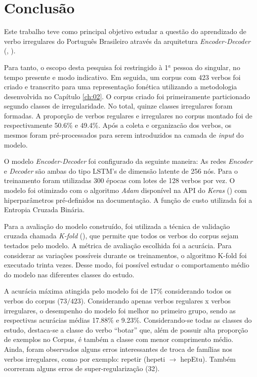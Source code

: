 \chapter{Conclusão}
\label{ch:08}

Este trabalho teve como principal objetivo estudar a questão do aprendizado de verbo irregulares do Português Brasileiro através da arquitetura \textit{Encoder-Decoder} (\cite{enc-dec:2014}, \cite{seq2seq:2014}). 

Para tanto, o escopo desta pesquisa foi restringido à 1$^{a}$ pessoa do singular, no tempo presente e modo indicativo. Em seguida, um corpus com 423 verbos foi criado e transcrito para uma representação fonética utilizando a metodologia desenvolvida no Capítulo \ref{ch:02}. O corpus criado foi primeiramente particionado segundo classes de irregularidade. No total, quinze classes irregulares foram formadas. A proporção de verbos regulares e irregulares no corpus montado foi de respectivamente 50.6\% e 49.4\%. Após a coleta e organizacão dos verbos, os mesmos foram pré-processados para serem introduzidos na camada de \textit{input} do modelo. 

O modelo \textit{Encoder-Decoder} foi configurado da seguinte maneira: As redes \textit{Encoder} e \textit{Decoder} são ambas do tipo LSTM's de dimensão latente de 256 nós. Para o treinamento foram utilizadas 300 épocas com lotes de 128 verbos por vez. O modelo foi otimizado com o algoritmo \textit{Adam} disponível na API do \textit{Keras} (\cite{chollet2015keras}) com hiperparâmetros pré-definidos na documentação. A função de custo utilizada foi a Entropia Cruzada Binária.

Para a avaliação do modelo construído, foi utilizada a técnica de validação cruzada chamada \textit{K-fold} (\cite{kfold:2018}), que permite que todos os verbos do corpus sejam testados pelo modelo. A métrica de avaliação escolhida foi a acurácia. Para considerar as variações possíveis durante os treinamentos, o algoritmo K-fold foi executado trinta vezes. Desse modo, foi possível estudar o comportamento médio do modelo nas diferentes classes do estudo.

A acurácia máxima atingida pelo modelo foi de 17\% considerando todos os verbos do corpus ($73/423$). Considerando apenas verbos regulares x verbos irregulares, o desempenho do modelo foi melhor no primeiro grupo, sendo as respectivas acurácias médias 17.88\% e 9.23\%. Considerando-se todas as classes do estudo, destaca-se a classe do verbo “botar” que, além de possuir alta proporção de exemplos no Corpus, é também a classe com menor comprimento médio. Ainda, foram observados alguns erros interessantes de troca de famílias nos verbos irregulares, como por exemplo: repetir (hepeti $\rightarrow$ hepEtu). Também ocorreram alguns erros de super-regularização (32). 


